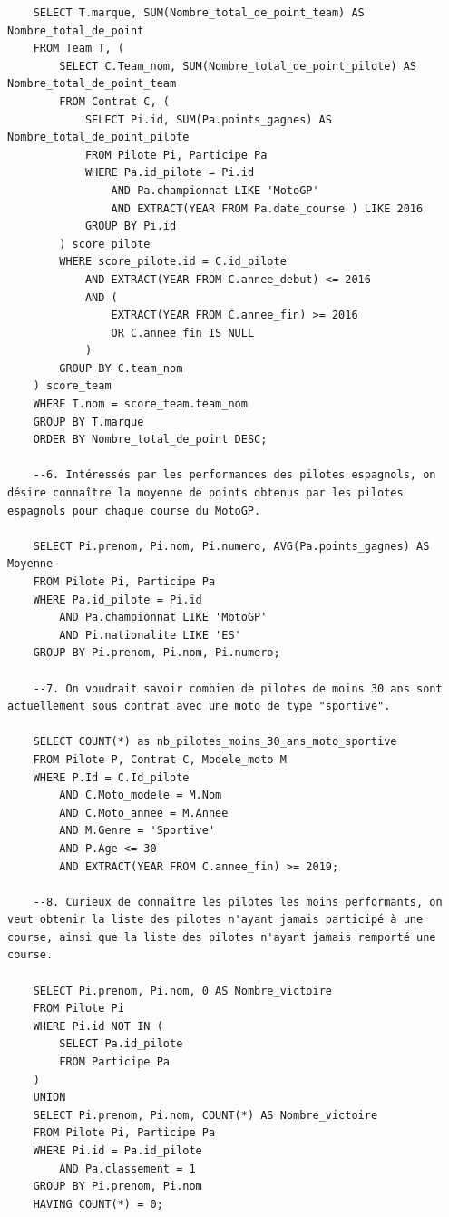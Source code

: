 \documentclass[12pt,a4paper]{article}
\newenvironment{code}{\captionsetup{type=listing}}{}
\begin{document}
\begin{code}
\begin{verbatim}
    SELECT T.marque, SUM(Nombre_total_de_point_team) AS Nombre_total_de_point
    FROM Team T, (
        SELECT C.Team_nom, SUM(Nombre_total_de_point_pilote) AS Nombre_total_de_point_team
        FROM Contrat C, (
            SELECT Pi.id, SUM(Pa.points_gagnes) AS Nombre_total_de_point_pilote
            FROM Pilote Pi, Participe Pa
            WHERE Pa.id_pilote = Pi.id
                AND Pa.championnat LIKE 'MotoGP'
                AND EXTRACT(YEAR FROM Pa.date_course ) LIKE 2016
            GROUP BY Pi.id
        ) score_pilote
        WHERE score_pilote.id = C.id_pilote
            AND EXTRACT(YEAR FROM C.annee_debut) <= 2016
            AND (
                EXTRACT(YEAR FROM C.annee_fin) >= 2016
                OR C.annee_fin IS NULL
            )
        GROUP BY C.team_nom
    ) score_team
    WHERE T.nom = score_team.team_nom
    GROUP BY T.marque
    ORDER BY Nombre_total_de_point DESC;
    
    --6. Intéressés par les performances des pilotes espagnols, on désire connaître la moyenne de points obtenus par les pilotes espagnols pour chaque course du MotoGP.

    SELECT Pi.prenom, Pi.nom, Pi.numero, AVG(Pa.points_gagnes) AS Moyenne
    FROM Pilote Pi, Participe Pa
    WHERE Pa.id_pilote = Pi.id
        AND Pa.championnat LIKE 'MotoGP'
        AND Pi.nationalite LIKE 'ES'
    GROUP BY Pi.prenom, Pi.nom, Pi.numero;
    
    --7. On voudrait savoir combien de pilotes de moins 30 ans sont actuellement sous contrat avec une moto de type "sportive".

    SELECT COUNT(*) as nb_pilotes_moins_30_ans_moto_sportive
    FROM Pilote P, Contrat C, Modele_moto M
    WHERE P.Id = C.Id_pilote
        AND C.Moto_modele = M.Nom
        AND C.Moto_annee = M.Annee
        AND M.Genre = 'Sportive'
        AND P.Age <= 30
        AND EXTRACT(YEAR FROM C.annee_fin) >= 2019;
        
    --8. Curieux de connaître les pilotes les moins performants, on veut obtenir la liste des pilotes n'ayant jamais participé à une course, ainsi que la liste des pilotes n'ayant jamais remporté une course.

    SELECT Pi.prenom, Pi.nom, 0 AS Nombre_victoire
    FROM Pilote Pi
    WHERE Pi.id NOT IN (
        SELECT Pa.id_pilote
        FROM Participe Pa
    )
    UNION
    SELECT Pi.prenom, Pi.nom, COUNT(*) AS Nombre_victoire
    FROM Pilote Pi, Participe Pa
    WHERE Pi.id = Pa.id_pilote
        AND Pa.classement = 1
    GROUP BY Pi.prenom, Pi.nom
    HAVING COUNT(*) = 0;   
    

\end{verbatim}
\end{code}
\end{document}
